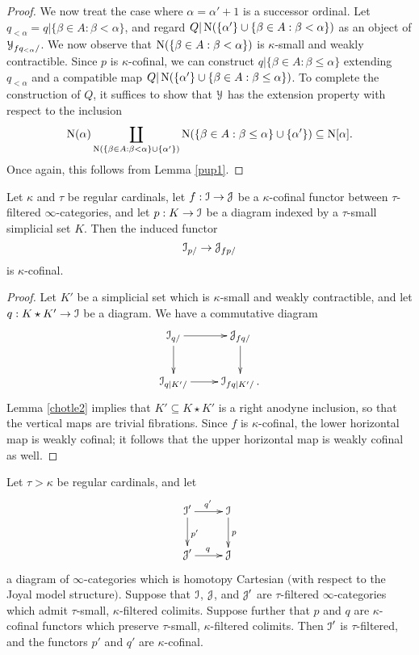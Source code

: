 \begin{proof}
We now treat the case where $\alpha = \alpha' + 1$ is a successor ordinal. Let
$q_{< \alpha} = q | \{ \beta \in A: \beta < \alpha\}$, and regard
$Q | \operatorname{N} ( \{ \alpha' \} \cup \{ \beta \in A: \beta < \alpha \} )$ as an object of
$\operatorname{\mathcal{Y}}_{f  q_{< \alpha} /}$. We now observe that $\operatorname{N} (\{ \beta \in A: \beta < \alpha\})$ is $\kappa$-small and weakly contractible. Since $p$ is $\kappa$-cofinal, we can construct
$q | \{ \beta \in A: \beta \leq \alpha\}$ extending $q_{< \alpha}$ and a compatible map
$Q | \operatorname{N} ( \{ \alpha' \} \cup \{ \beta \in A: \beta \leq \alpha \} )$. To complete the construction of $Q$, it suffices to show that $\operatorname{\mathcal{Y}}$ has the extension property with respect to the inclusion
$$ \operatorname{N} (\alpha)  \coprod_{ \operatorname{N} (\{ \beta \in A: \beta < \alpha \} \cup \{ \alpha' \}) }
\operatorname{N} (\{ \beta \in A: \beta \leq \alpha \} \cup \{\alpha' \}) \subseteq \operatorname{N} [\alpha]. $$ Once again, this follows from Lemma \ref{pup1}.
\end{proof}

\begin{lemma}\label{wolfpup2}
Let $\kappa$ and $\tau$ be regular cardinals, let $f: \operatorname{\mathcal{I}} \rightarrow \operatorname{\mathcal{J}}$ be a $\kappa$-cofinal functor between $\tau$-filtered $\infty$-categories, and let $p: K \rightarrow \operatorname{\mathcal{I}}$ be a diagram indexed by a $\tau$-small simplicial set $K$. Then the induced functor
$$ \operatorname{\mathcal{I}}_{p/} \rightarrow \operatorname{\mathcal{J}}_{f  p/}$$ is $\kappa$-cofinal.
\end{lemma}

\begin{proof}
Let $K'$ be a simplicial set which is $\kappa$-small and weakly contractible, and let
$q: K \star K' \rightarrow \operatorname{\mathcal{I}}$ be a diagram. We have a commutative diagram
$$ \xymatrix{ \calI_{q/} \ar[r] \ar[d] & \calJ_{f  q/} \ar[d] \\
\calI_{q|K' / } \ar[r] & \calI_{f  q|K' /}. }$$
Lemma \ref{chotle2} implies that $K' \subseteq K \star K'$ is a right anodyne inclusion, so that the vertical maps are trivial fibrations. Since $f$ is $\kappa$-cofinal, the lower horizontal map is
weakly cofinal; it follows that the upper horizontal map is weakly cofinal as well.
\end{proof}

\begin{lemma}\label{rebuswolf}
Let $\tau > \kappa$ be regular cardinals, and let
$$ \xymatrix{ \calI' \ar[r]^{q'} \ar[d]^{p'} & \calI \ar[d]^{p} \\
\calJ' \ar[r]^{q} & \calJ }$$
a diagram of $\infty$-categories which is homotopy Cartesian $($with respect to the Joyal model structure$)$. Suppose that $\operatorname{\mathcal{I}}$, $\operatorname{\mathcal{J}}$, and $\operatorname{\mathcal{J}}'$ are $\tau$-filtered $\infty$-categories which admit $\tau$-small, $\kappa$-filtered colimits. Suppose further that $p$ and $q$ are $\kappa$-cofinal functors which preserve $\tau$-small, $\kappa$-filtered colimits. Then $\operatorname{\mathcal{I}}'$ is $\tau$-filtered, and the functors $p'$ and $q'$ are $\kappa$-cofinal.
\end{lemma}

